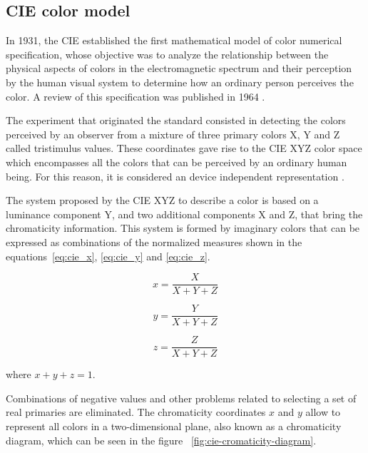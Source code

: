\subsection{CIE color model}
\label{sec:modelo_cores_cie}

In 1931, the CIE established the first mathematical model of color numerical specification, whose objective was to analyze the relationship between the physical aspects of colors in the electromagnetic spectrum and their perception by the human visual system to determine how an ordinary person perceives the color. A review of this specification was published in 1964 \citep{gonzalez:02}.

The experiment that originated the standard consisted in detecting the colors perceived by an observer from a mixture of three primary colors X, Y and Z called tristimulus values. These coordinates gave rise to the CIE XYZ color space which encompasses all the colors that can be perceived by an ordinary human being. For this reason, it is considered an device independent representation \citep{konstantinos:00}.

The system proposed by the CIE XYZ to describe a color is based on a luminance component Y, and two additional components X and Z, that bring the chromaticity information. This system is formed by imaginary colors that can be expressed as combinations of the normalized measures shown in the equations~\ref{eq:cie_x}, \ref{eq:cie_y} and \ref{eq:cie_z}.

\begin{equation}
  x = \frac{X}{X + Y + Z}
\label{eq:cie_x}
\end{equation}

\begin{equation}
  y = \frac{Y}{X + Y + Z}
\label{eq:cie_y}
\end{equation}

\begin{equation}
  z = \frac{Z}{X + Y + Z}
\label{eq:cie_z}
\end{equation}

where $x + y+ z = 1$.

Combinations of negative values and other problems related to selecting a set of real primaries are eliminated. The chromaticity coordinates $x$ and $y$ allow to represent all colors in a two-dimensional plane, also known as a chromaticity diagram, which can be seen in the figure ~\ref{fig:cie-cromaticity-diagram}.

